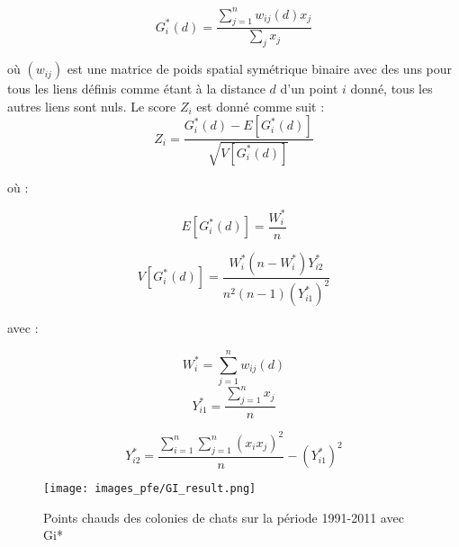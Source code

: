 \medskip

\begin{equation}
    G_i^*(d) = \frac{\sum_{j=1}^n w_{ij}(d)x_j}{\sum_j x_j}
\end{equation}

\medskip
où $(w_{ij})$ est une matrice de poids spatial symétrique binaire avec des uns pour tous les liens définis comme étant à la distance $d$ d'un point $i$ donné, tous les autres liens sont nuls.
\medskip
Le score $Z_i$ est donné comme suit :
\medskip
\begin{equation}
    Z_i = \frac{G_i^*(d) - E [G_i^*(d)]}{\sqrt{V[G_i^*(d)]}}
\end{equation}

\medskip

où :

\medskip

\begin{equation}
    E[G_i^*(d)] = \frac{W_i^*}{n}
\end{equation}

\begin{equation}
    V[G_i^*(d)] = \frac{W_i^*(n - W_i^*)Y_{i2}^*}{n^2(n - 1) (Y_{i1}^*)^2}
\end{equation}

\medskip
avec :

\medskip
\begin{equation}
    W_i^* = \sum_{j=1}^n w_{ij}(d)
\end{equation}
\begin{equation}
    Y_{i1}^* = \frac{\sum_{j=1}^n x_j}{n}
\end{equation}

\begin{equation}
    Y_{i2}^* = \frac{\sum_{i=1}^n \sum_{j=1}^n (x_i x_j)^2}{n} - (Y_{i1}^*)^2
\end{equation}

\medskip

\begin{figure}[hbt!]
  \centering
  \texttt{[image: images\_pfe/GI\_result.png]}
  \caption{Points chauds des colonies de chats sur la période 1991-2011 avec Gi* \parencite{aguilar_distribution_2013}}
  \label{fig:gi-result}
\end{figure}
\FloatBarrier

\medskip

